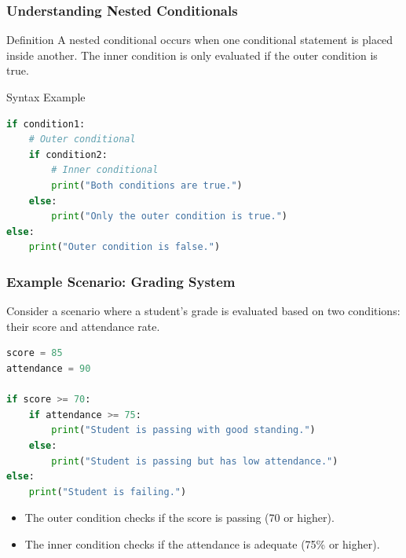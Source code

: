 \documentclass{beamer}
\begin{document}
\begin{frame}[fragile]
    \frametitle{Understanding Nested Conditionals}
    \begin{block}{Definition}
        A nested conditional occurs when one conditional statement is placed inside another. The inner condition is only evaluated if the outer condition is true.
    \end{block}
    
    \begin{block}{Syntax Example}
    \begin{lstlisting}[language=Python]
if condition1:
    # Outer conditional
    if condition2:
        # Inner conditional
        print("Both conditions are true.")
    else:
        print("Only the outer condition is true.")
else:
    print("Outer condition is false.")
    \end{lstlisting}
    \end{block}
\end{frame}

\begin{frame}[fragile]
    \frametitle{Example Scenario: Grading System}
    Consider a scenario where a student’s grade is evaluated based on two conditions: their score and attendance rate.
    
    \begin{lstlisting}[language=Python]
score = 85
attendance = 90

if score >= 70:
    if attendance >= 75:
        print("Student is passing with good standing.")
    else:
        print("Student is passing but has low attendance.")
else:
    print("Student is failing.")
    \end{lstlisting}
    
    \begin{itemize}
        \item The outer condition checks if the score is passing (70 or higher).
        \item The inner condition checks if the attendance is adequate (75\% or higher).
    \end{itemize}
\end{frame}
\end{document}
